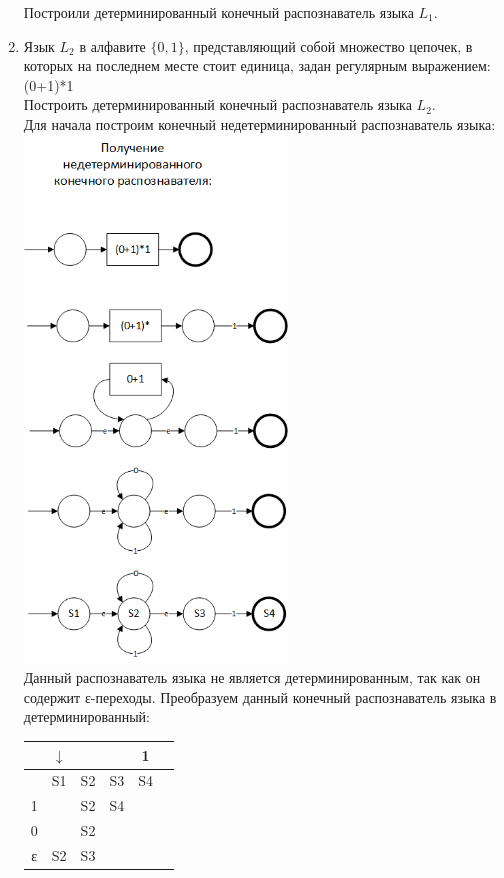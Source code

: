 \documentclass[a4paper,14pt]{extarticle}
\begin{document}
\begin{enumerate}[1.]
Построили детерминированный конечный распознаватель языка $L_1$.

\item Язык $L_2$ в алфавите $\{0,1\}$, представляющий собой множество цепочек, в
которых на последнем месте стоит единица, задан регулярным выражением:\\
(0+1)*1\\
Построить детерминированный конечный распознаватель языка $L_2$.\\
Для начала построим конечный недетерминированный распознаватель языка:\\
\includegraphics[width=70mm]{task2_non_determined}\\
Данный распознаватель языка не является детерминированным, 
так как он содержит ε-переходы. 
Преобразуем данный конечный распознаватель языка в детерминированный:\\
\begin{tabular}{|c|c|c|c|c|c|}
	\hline
	   & $\downarrow$ &    &    & 1  \\
	\hline
	   & S1           & S2 & S3 & S4 \\
	\hline
	1  &              & S2 & S4 &    \\
	\hline
	0  &              & S2 &    &    \\
	\hline
	ε  & S2           & S3 &    &    \\
	\hline
\end{tabular}


\end{enumerate}
\end{document}
